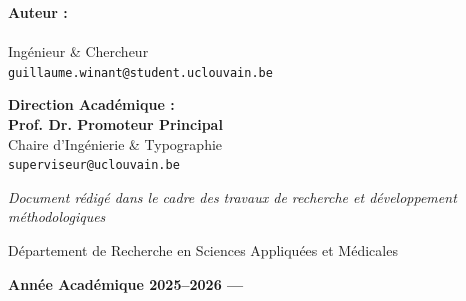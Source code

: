 \begin{titlepage}
\begin{singlespace}
  \vspace{1.5cm}

  \begin{minipage}[t]{0.46\textwidth}
    \begin{flushleft}\large
      \textcolor{primaryColor}{\bfseries\sffamily Auteur :}\\
      \textbf{\theauthor}\\
      \small Ingénieur \& Chercheur\\
      \footnotesize\texttt{guillaume.winant@student.uclouvain.be}
    \end{flushleft}
  \end{minipage}
  \hfill
  \begin{minipage}[t]{0.46\textwidth}
    \begin{flushright}\large
      \textcolor{primaryColor}{\bfseries\sffamily Direction Académique :}\\
      \textbf{Prof. Dr. Promoteur Principal}\\
      \small Chaire d'Ingénierie \& Typographie\\
      \footnotesize\texttt{superviseur@uclouvain.be}
    \end{flushright}
  \end{minipage}

  \vfill

  {\small\textit{Document rédigé dans le cadre des travaux de recherche et développement méthodologiques}\par}
  \vspace{0.2cm}
  {\footnotesize Département de Recherche en Sciences Appliquées et Médicales\par}

  \vspace{0.8cm}

  {\large\sffamily\bfseries Année Académique 2025--2026 \quad---\quad \thedate\par}

  \end{singlespace}
\end{titlepage}
